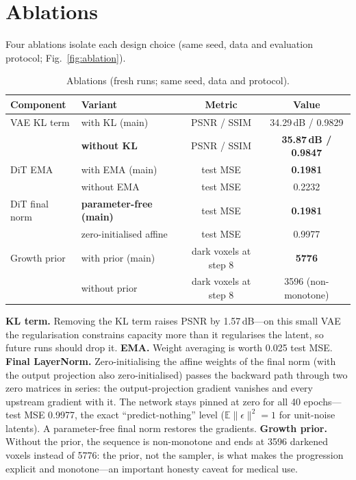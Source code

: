 \documentclass[runningheads]{llncs}
\begin{document}
\section{Ablations}
\label{sec:ablations}
Four ablations isolate each design choice (same seed, data and evaluation protocol; Fig.~\ref{fig:ablation}).

\begin{table}[t]
\centering
\caption{Ablations (fresh runs; same seed, data and protocol).}
\label{tab:ablation}
\begin{tabular}{llcc}
\toprule
Component & Variant & Metric & Value \\
\midrule
VAE KL term & with KL (main) & PSNR / SSIM & 34.29\,dB / 0.9829 \\
 & \textbf{without KL} & PSNR / SSIM & \textbf{35.87\,dB / 0.9847} \\
DiT EMA & with EMA (main) & test MSE & \textbf{0.1981} \\
 & without EMA & test MSE & 0.2232 \\
DiT final norm & \textbf{parameter-free (main)} & test MSE & \textbf{0.1981} \\
 & zero-initialised affine & test MSE & 0.9977 \\
Growth prior & with prior (main) & dark voxels at step 8 & \textbf{5776} \\
 & without prior & dark voxels at step 8 & 3596 (non-monotone) \\
\bottomrule
\end{tabular}
\end{table}

\textbf{KL term.} Removing the KL term raises PSNR by 1.57\,dB---on this small VAE the regularisation constrains capacity more than it regularises the latent, so future runs should drop it. \textbf{EMA.} Weight averaging is worth 0.025 test MSE. \textbf{Final LayerNorm.} Zero-initialising the affine weights of the final norm (with the output projection also zero-initialised) passes the backward path through two zero matrices in series: the output-projection gradient vanishes and every upstream gradient with it. The network stays pinned at zero for all 40 epochs---test MSE 0.9977, the exact ``predict-nothing'' level ($\mathbb{E}\|\epsilon\|^2=1$ for unit-noise latents). A parameter-free final norm restores the gradients. \textbf{Growth prior.} Without the prior, the sequence is non-monotone and ends at 3596 darkened voxels instead of 5776: the prior, not the sampler, is what makes the progression explicit and monotone---an important honesty caveat for medical use.
\end{document}
